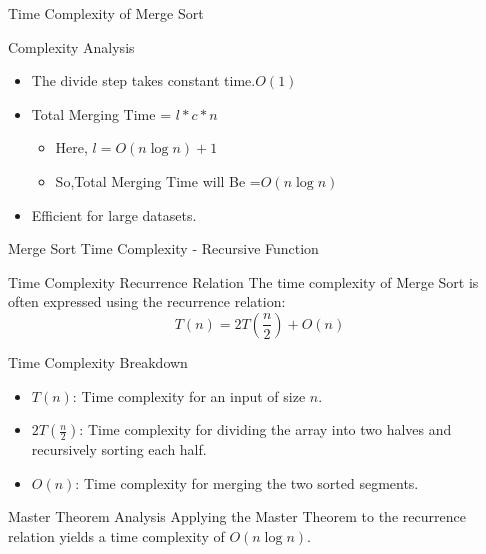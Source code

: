 \documentclass{beamer}
\begin{document}
\begin{frame}{Time Complexity of Merge Sort}
  \begin{block}{Complexity Analysis}
    \begin{itemize}
      \item The divide step takes constant time.\(O(1)\)
      \item Total Merging Time = \(l*c*n\)
            \begin{itemize}
              \item Here, \(l=O(n \log n)+1\)
              \item So,Total Merging Time will Be =\(O(n \log n)\)
            \end{itemize}
      \item Efficient for large datasets.
    \end{itemize}
  \end{block}
\end{frame}
\begin{frame}{Merge Sort Time Complexity - Recursive Function}
  \begin{block}{Time Complexity Recurrence Relation}
    The time complexity of Merge Sort is often expressed using the recurrence relation:
    \[ T(n) = 2T\left(\frac{n}{2}\right) + O(n) \]
  \end{block}
  \begin{block}{Time Complexity Breakdown}
    \begin{itemize}
      \item \( T(n) \): Time complexity for an input of size \( n \).
      \item \( 2T\left(\frac{n}{2}\right) \): Time complexity for dividing the array into two halves and recursively sorting each half.
      \item \( O(n) \): Time complexity for merging the two sorted segments.
    \end{itemize}

  \end{block}

  \begin{block}{Master Theorem Analysis}
    Applying the Master Theorem to the recurrence relation yields a time complexity of \(O(n \log n)\).
  \end{block}

\end{frame}
\end{document}
